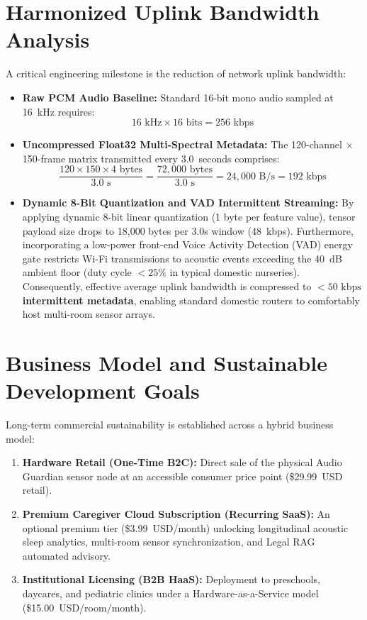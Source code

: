 \documentclass[12pt, a4paper]{report}
\begin{document}
\section{Harmonized Uplink Bandwidth Analysis}
A critical engineering milestone is the reduction of network uplink bandwidth:
\begin{itemize}
    \item \textbf{Raw PCM Audio Baseline:} Standard 16-bit mono audio sampled at 16~kHz requires:
    \begin{equation}
    16\text{ kHz} \times 16\text{ bits} = 256\text{ kbps}
    \end{equation}
    \item \textbf{Uncompressed Float32 Multi-Spectral Metadata:} The 120-channel $\times$ 150-frame matrix transmitted every 3.0~seconds comprises:
    \begin{equation}
    \frac{120 \times 150 \times 4\text{ bytes}}{3.0\text{ s}} = \frac{72,000\text{ bytes}}{3.0\text{ s}} = 24,000\text{ B/s} = 192\text{ kbps}
    \end{equation}
    \item \textbf{Dynamic 8-Bit Quantization and VAD Intermittent Streaming:} By applying dynamic 8-bit linear quantization (1 byte per feature value), tensor payload size drops to 18,000 bytes per 3.0s window (48~kbps). Furthermore, incorporating a low-power front-end Voice Activity Detection (VAD) energy gate restricts Wi-Fi transmissions to acoustic events exceeding the 40~dB ambient floor (duty cycle $< 25\%$ in typical domestic nurseries). Consequently, effective average uplink bandwidth is compressed to \textbf{$< 50\text{ kbps}$ intermittent metadata}, enabling standard domestic routers to comfortably host multi-room sensor arrays.
\end{itemize}

\section{Business Model and Sustainable Development Goals}
Long-term commercial sustainability is established across a hybrid business model:
\begin{enumerate}
    \item \textbf{Hardware Retail (One-Time B2C):} Direct sale of the physical Audio Guardian sensor node at an accessible consumer price point (\$29.99~USD retail).
    \item \textbf{Premium Caregiver Cloud Subscription (Recurring SaaS):} An optional premium tier (\$3.99~USD/month) unlocking longitudinal acoustic sleep analytics, multi-room sensor synchronization, and Legal RAG automated advisory.
    \item \textbf{Institutional Licensing (B2B HaaS):} Deployment to preschools, daycares, and pediatric clinics under a Hardware-as-a-Service model (\$15.00~USD/room/month).
\end{enumerate}
\end{document}
